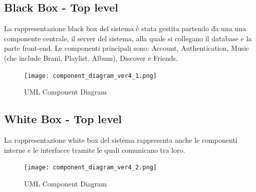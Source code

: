 \vspace{2cm}
\subsection{Black Box - Top level}
La rappresentazione black box del sistema è stata gestita partendo da una
una componente centrale, il server del sistema, alla quale si collegano il database e la parte front-end.
Le componenti principali sono: Account, Authentication, Music (che include Brani, Playlist, Album),
Discover e Friends.
\begin{figure}[H]
    \centering
    \texttt{[image: component\_diagram\_ver4\_1.png]}
    \caption{UML Component Diagram}
    \label{fig-uml-component-diag_1}
\end{figure}

\newpage
\subsection{White Box - Top level}
La rappresentazione white box del sistema rappresenta anche le componenti
interne e le interfacce tramite le quali comunicano tra loro.

\begin{figure}[H]
    \centering
    \texttt{[image: component\_diagram\_ver4\_2.png]}
    \caption{UML Component Diagram}
    \label{fig-uml-component-diag_2}
\end{figure}

